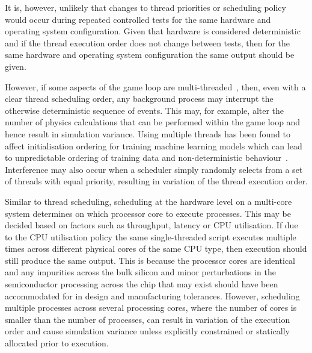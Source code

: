 \documentclass[letterpaper, 10 pt, journal, twoside]{IEEEtran}
\begin{document}
It is, however, unlikely that changes to thread priorities or scheduling policy would occur during repeated controlled tests for the same hardware and operating system configuration. Given that hardware is considered deterministic and if the thread execution order does not change between tests, then for the same hardware and operating system configuration the same output should be given. 

However, if some aspects of the game loop are multi-threaded~\cite{unity_multithreading}, then, even with a clear thread scheduling order, any background process may interrupt the otherwise deterministic sequence of events. This may, for example, alter the number of physics calculations that can be performed within the game loop and hence result in simulation variance.
%
Using multiple threads has been found to affect initialisation ordering for training machine learning models which can lead to unpredictable ordering of training data and non-deterministic behaviour~\cite{Sculley2015,Breck2017}.
%
%
Interference may also occur when a scheduler simply randomly selects from a set of threads with equal priority, resulting in variation of the thread execution order.

Similar to thread scheduling, scheduling at the hardware level on a multi-core system determines on which processor core to execute processes. This may be decided based on factors such as throughput, latency or CPU utilisation. 
%
If due to the CPU utilisation policy the same single-threaded script executes multiple times across different physical cores of the same CPU type,  then execution should still produce the same output. 
%
This is because the processor cores are identical and any impurities across the bulk silicon and minor perturbations in the semiconductor processing across the chip that may exist should have been accommodated for in design and manufacturing tolerances.
%
However, scheduling multiple processes across several processing cores, where the number of cores is smaller than the number of processes, can result in variation of the execution order and cause simulation variance unless explicitly constrained or statically allocated prior to execution. 
\end{document}
